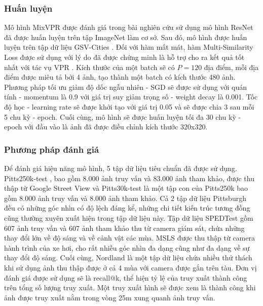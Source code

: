 \subsubsection{Huấn luyện}
Mô hình MixVPR được đánh giá trong bài nghiên cứu sử dụng mô hình ResNet \cite{he2016deep} đã được huấn luyện trên tập ImageNet \cite{krizhevsky2012imagenet} làm cơ sở. Sau đó, mô hình được huấn luyện trên tập dữ liệu GSV-Cities \cite{Ali_bey_2022}. Đối với hàm mất mát, hàm Multi-Similarity Loss \cite{wang2019multi} được sử dụng với lý do đã được chứng minh là hỗ trợ cho ra kết quả tốt nhất với tác vụ VPR \cite{Ali_bey_2022}. Kích thước của một batch sẽ có $P = 120$ địa điểm, mỗi địa điểm được miêu tả bởi 4 ảnh, tạo thành một batch có kích thước 480 ảnh. Phương pháp tối ưu giảm độ dốc ngẫu nhiên - SGD sẽ được sử dụng với quán tính - momentum là 0.9 với giá trị suy giảm trọng số - weight decay là 0.001. Tốc độ học - learning rate sẽ được khởi tạo với giá trị 0.05 và sẽ được chia 3 sau mỗi 5 chu kỳ - epoch. Cuối cùng, mô hình sẽ được huấn luyện tối đa 30 chu kỳ - epoch với đầu vào là ảnh đã được điều chỉnh kích thước 320x320.

\subsubsection{Phương pháp đánh giá}
Để đánh giá hiệu năng mô hình, 5 tập dữ liệu tiêu chuẩn đã được sử dụng. Pitts250k-test \cite{6618963}, bao gồm 8.000 ảnh truy vấn và 83.000 ảnh tham khảo, được thu thập từ Google Street View và Pitts30k-test \cite{6618963} là một tập con của Pitts250k bao gồm 8.000 ảnh truy vấn và 8.000 ảnh tham khảo. Cả 2 tập dữ liệu Pittsburgh đều có những góc nhìn có độ lệch đáng kể, những chi tiết kiến trúc tương đồng cũng thường xuyên xuất hiện trong tập dữ liệu này. Tập dữ liệu SPEDTest \cite{zaffar2021vpr} gồm 607 ảnh truy vấn và 607 ảnh tham khảo thu từ camera giám sát, chứa những thay đổi lớn về độ sáng và về cảnh vật các mùa. MSLS \cite{warburg2020mapillary} được thu thập từ camera hành trình của xe hơi, cho rất nhiều góc nhìn đa dạng cũng như đa dạng về sự thay đổi độ sáng. Cuối cùng, Nordland \cite{zaffar2021vpr} là một tập dữ liệu chứa nhiều thử thách khi sử dụng ảnh thu thập được ở cả 4 mùa với camera được gắn trên tàu. Đơn vị đánh giá được sử dụng sẽ là recall@k, thể hiện tỷ lệ của truy xuất thành công trên tổng số lượng truy xuất. Một truy xuất hình sẽ được xem là thành công khi ảnh được truy xuất nằm trong vòng 25m xung quanh ảnh truy vấn.

